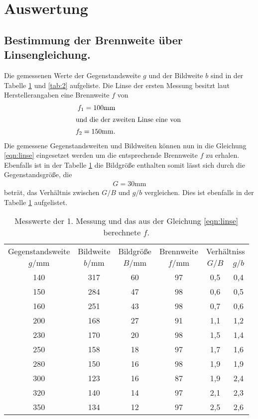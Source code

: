 \section{Auswertung}
\label{sec:Auswertung}
\subsection{Bestimmung der Brennweite über Linsengleichung.}
\label{sec:1}
Die gemessenen Werte  der Gegenstandsweite $g$ und der Bildweite $b$  sind
in der Tabelle \ref{tab:1} und \ref{tab:2} aufgeliste.
Die Linse der ersten Messung besitzt laut Herstellerangaben eine Brennweite $f$
von
\begin{align*}
  f_1=100\si{\milli\meter}\\
\intertext{und die der zweiten Linse eine von }
  f_2=150\si{\milli\meter}.
\end{align*}
Die gemessene Gegenstandsweiten und Bildweiten können nun in die Gleichung
\eqref{eqn:linse} eingesetzet werden um die entsprechende Brennweite $f$
zu erhalen. Ebenfalls ist in der Tabelle \ref{tab:1}
die Bildgröße enthalten somit lässt sich durch die Gegenstandsgröße, die
\begin{align*}
  G=30\si{\milli\meter}
\end{align*}
beträt, das Verhältnis zwischen $G/B$ und $g/b$ vergleichen. Dies ist ebenfalls
in der Tabelle \ref{tab:1} aufgelistet.
\begin{table}
  \centering
  \caption{Messwerte der 1. Messung und das aus der Gleichung
   \eqref{eqn:linse} berechnete $f$.}
  \label{tab:1}
  \begin{tabular}{c c c c c c}
  \toprule
  Gegenstandsweite   & Bildweite & Bildgröße & Brennweite & \multicolumn{2}{c}{Verhältniss}\\
  $g/\si{\milli\meter}$ & $b/\si{\milli\meter}$ & $B/\si{\milli\meter}$& $f/\si{\milli\meter}$& $G/B$ &$g/b$\\
  \midrule
  140   &   317  &   60 & 97 &0,5 &0,4 \\
  150   &   284  &   47 & 98 &0,6 &0,5 \\
  160   &   251  &   43 & 98 &0,7 &0,6 \\
  200   &   168  &   27 & 91 &1,1 &1,2 \\
  230   &   170  &   20 & 98 &1,5 &1,4 \\
  250   &   158  &   18 & 97 &1,7 &1,6 \\
  280   &   150  &   16 & 98 &1,9 &1,9 \\
  300   &   123  &   16 & 87 &1,9 &2,4 \\
  320   &   140  &   14 & 97 &2,1 &2,3 \\
  350   &   134  &   12 & 97 &2,5 &2,6 \\
  \bottomrule
 \end{tabular}
\end{table}
